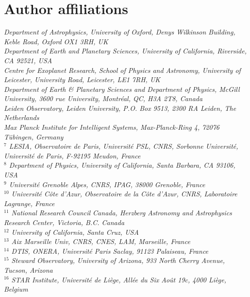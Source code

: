 \documentclass[
    usenatbib,
]{mnras}
\makeatletter
\newcommand{\affiliationtarget}[1]{\Hy@raisedlink{\hypertarget{#1}{}}}
\makeatother
\begin{document}
\section*{Author affiliations}
\begingroup
\itshape
\affiliationtarget{1}{$^{1}$} Department of Astrophysics, University of Oxford, Denys Wilkinson Building, Keble Road, Oxford OX1 3RH, UK\\
\affiliationtarget{2}{$^{2}$} Department of Earth and Planetary Sciences, University of California, Riverside, CA 92521, USA \\
\affiliationtarget{3}{$^{3}$} Centre for Exoplanet Research, School of Physics and Astronomy, University of Leicester, University Road, Leicester, LE1 7RH, UK\\
\affiliationtarget{4}{$^{4}$} Department of Earth \& Planetary Sciences and Department of Physics, McGill University, 3600 rue University, Montréal, QC, H3A 2T8, Canada\\
\affiliationtarget{5}{$^{5}$} Leiden Observatory, Leiden University, P.O. Box 9513, 2300 RA Leiden, The Netherlands\\
\affiliationtarget{6}{$^{6}$} Max Planck Institute for Intelligent Systems, Max-Planck-Ring 4, 72076 Tübingen, Germany \\
$^{7}$ LESIA, Observatoire de Paris, Université PSL, CNRS, Sorbonne Université, Université de Paris, F-92195 Meudon, France \\
$^{8}$ Department of Physics, University of California, Santa Barbara, CA 93106, USA \\
$^{9}$ Université Grenoble Alpes, CNRS, IPAG, 38000 Grenoble, France \\
$^{10}$ Université Côte d'Azur, Observatoire de la Côte d'Azur, CNRS, Laboratoire Lagrange, France \\
$^{11}$ National Research Council Canada, Herzberg Astronomy and Astrophysics Research Center, Victoria, B.C. Canada \\
$^{12}$ University of California, Santa Cruz, USA  \\
$^{13}$ Aix Marseille Univ, CNRS, CNES, LAM, Marseille, France \\
$^{14}$ DTIS, ONERA, Université Paris Saclay, 91123 Palaiseau, France \\
$^{15}$ Steward Observatory, University of Arizona, 933 North Cherry Avenue, Tucson, Arizona \\
$^{16}$ STAR Institute, Université de Li\`ege, All\'ee du Six Ao\^ut 19c, 4000 Li\`ege, Belgium \\
\end{document}
